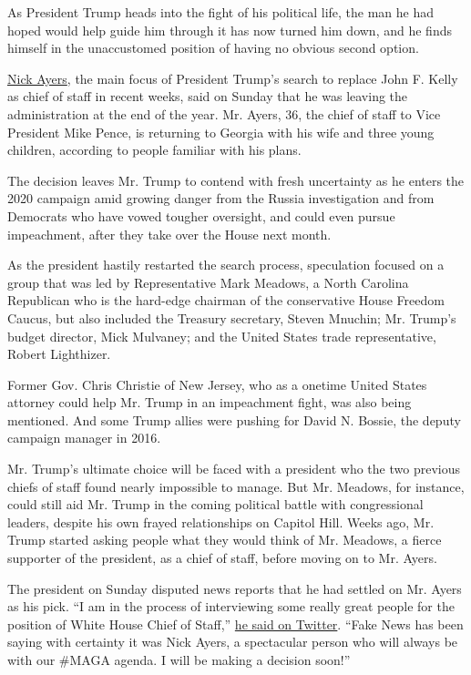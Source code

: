 As President Trump heads into the fight of his political life, the man
he had hoped would help guide him through it has now turned him down,
and he finds himself in the unaccustomed position of having no obvious
second option.

\href{https://www.nytimes.com/2018/11/21/us/politics/nick-ayers-white-house.html}{Nick
Ayers}, the main focus of President Trump's search to replace John F.
Kelly as chief of staff in recent weeks, said on Sunday that he was
leaving the administration at the end of the year. Mr. Ayers, 36, the
chief of staff to Vice President Mike Pence, is returning to Georgia
with his wife and three young children, according to people familiar
with his plans.

The decision leaves Mr. Trump to contend with fresh uncertainty as he
enters the 2020 campaign amid growing danger from the Russia
investigation and from Democrats who have vowed tougher oversight, and
could even pursue impeachment, after they take over the House next
month.

As the president hastily restarted the search process, speculation
focused on a group that was led by Representative Mark Meadows, a North
Carolina Republican who is the hard-edge chairman of the conservative
House Freedom Caucus, but also included the Treasury secretary, Steven
Mnuchin; Mr. Trump's budget director, Mick Mulvaney; and the United
States trade representative, Robert Lighthizer.

Former Gov. Chris Christie of New Jersey, who as a onetime United States
attorney could help Mr. Trump in an impeachment fight, was also being
mentioned. And some Trump allies were pushing for David N. Bossie, the
deputy campaign manager in 2016.

Mr. Trump's ultimate choice will be faced with a president who the two
previous chiefs of staff found nearly impossible to manage. But Mr.
Meadows, for instance, could still aid Mr. Trump in the coming political
battle with congressional leaders, despite his own frayed relationships
on Capitol Hill. Weeks ago, Mr. Trump started asking people what they
would think of Mr. Meadows, a fierce supporter of the president, as a
chief of staff, before moving on to Mr. Ayers.

The president on Sunday disputed news reports that he had settled on Mr.
Ayers as his pick. ``I am in the process of interviewing some really
great people for the position of White House Chief of Staff,''
\href{https://twitter.com/realDonaldTrump/status/1071939400517500929}{he
said on Twitter}. ``Fake News has been saying with certainty it was Nick
Ayers, a spectacular person who will always be with our \#MAGA agenda. I
will be making a decision soon!''


